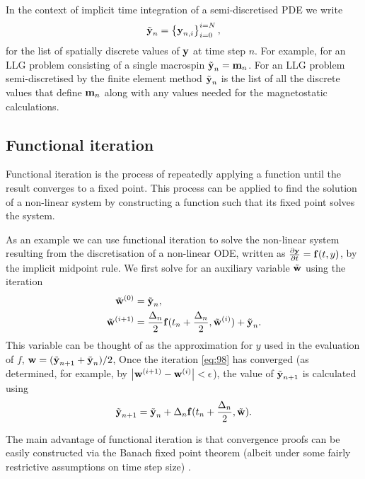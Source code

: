In the context of implicit time integration of a semi-discretised PDE we write
\begin{equation}
  \tilde{\boldsymbol{\mathrm{y}}}_n = \left\{ {\boldsymbol{\mathrm{y}}_{n,i}} \right\}_{i=0}^{i=N},
\end{equation}
for the list of spatially discrete values of $\boldsymbol{\mathrm{y}}$ at time step $n$.
For example, for an LLG problem consisting of a single macrospin $\tilde{\boldsymbol{\mathrm{y}}}_n = \boldsymbol{\mathrm{m}}_n$.
For an LLG problem semi-discretised by the finite element method $\tilde{\boldsymbol{\mathrm{y}}}_n$ is the list of all the discrete values that define $\boldsymbol{\mathrm{m}}_n$ along with any values needed for the magnetostatic calculations.


\subsection{Functional iteration}
\label{sec:picard}

Functional iteration is the process of repeatedly applying a function until the result converges to a fixed point.
This process can be applied to find the solution of a non-linear system by constructing a function such that its fixed point solves the system.

As an example we can use functional iteration to solve the non-linear system resulting from the discretisation of a non-linear ODE, written as $\frac{\partial \boldsymbol{\mathrm{y}}}{\partial t} = {\boldsymbol{\mathrm{f}}}(t,y)$, by the implicit midpoint rule.
We first solve for an auxiliary variable $\tilde{\boldsymbol{\mathrm{w}}}$ using the iteration
\begin{equation}
  \begin{aligned}
    {\tilde{\boldsymbol{\mathrm{w}}}}^{(0)} &= \tilde{\boldsymbol{\mathrm{y}}}_n, \\
    {\tilde{\boldsymbol{\mathrm{w}}}}^{(i+1)} &= \frac{\Delta_{n}}{2} {\boldsymbol{\mathrm{f}}}(t_n + \frac{\Delta_{n}}{2}, {\tilde{\boldsymbol{\mathrm{w}}}}^{(i)}) + \tilde{\boldsymbol{\mathrm{y}}}_n.
    \label{eq:98}
  \end{aligned}
\end{equation}
This variable can be thought of as the approximation for $y$ used in the evaluation of $f$, \ie $\boldsymbol{\mathrm{w}} = (\tilde{\boldsymbol{\mathrm{y}}}_{n+1} + \tilde{\boldsymbol{\mathrm{y}}}_n)/2$,
Once the iteration \cref{eq:98} has converged (as determined, for example, by $\left|{{\boldsymbol{\mathrm{w}}}^{(i+1)} - {\boldsymbol{\mathrm{w}}}^{(i)}} \right| < \epsilon$), the value of $\tilde{\boldsymbol{\mathrm{y}}}_{n+1}$ is calculated using
\begin{equation}
  \tilde{\boldsymbol{\mathrm{y}}}_{n+1} = \tilde{\boldsymbol{\mathrm{y}}}_n + \Delta_{n} {\boldsymbol{\mathrm{f}}}(t_n + \frac{\Delta_{n}}{2}, \tilde{\boldsymbol{\mathrm{w}}}).
\end{equation}

The main advantage of functional iteration is that convergence proofs can be easily constructed via the Banach fixed point theorem (albeit under some fairly restrictive assumptions on time step size) \cite[125]{Iserles2009}.

